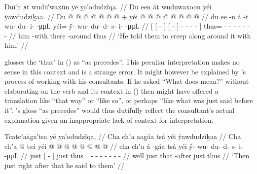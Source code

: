 \ex\label{ex:93-57-tell-them-go-with-him}%
%
\begingl
	\glpreamble	Duī′n ᴀt wudū′waxūn yē ỵa′odudzîqa. //
	\glpreamble	Du een át wuduwaxoon yéi ÿawdudziḵaa. //
	\gla	{} {} Du  @ {} {}
			{}  @ {} {}
			 @ {} @ {} @ {} @ {} @ {} {} +
		yéi @  @ {} @ {} @ {} @ {} @ {} @ {} @ {} //
	\glb	{} {} du ee -n {}
			{} á -t {}
			wu- du- i-  -μμL {} {}
		yéi= ÿ- wu- du- d- s- i-  -μμL //
	\glc	{}[ {}[   - {}]
			{}[  - {}]
			- - -  - \· {}]
		thus= - - - - - -  - //
	\gld	{} {} him {} -with {}
			{} there -around {}
			 {} {} {} {} {} {}
		thus  {} {} {} {} {} {} {} //
	\glft	‘He told them to creep along around it with him.’
		//
\endgl
\xe

\citeauthor{swanton:1909} glosses the  ‘thus’ in (\lastx) as “as precedes”.
This peculiar interpretation makes no sense in this context and is a strange error.
It might however be explained by \citeauthor{swanton:1909}’s process of working with his consultants.
If he asked “What does  mean?” without elaborating on the verb and its context in (\lastx) then  might have offered a translation like “that way” or “like so”, or perhaps “like what was just said before it”.
\citeauthor{swanton:1909}’s gloss “as precedes” would thus dutifully reflect the consultant’s actual explanation given an inappropriate lack of context for interpretation.


\ex\label{ex:93-58-right-then-he-said}%
%
\begingl
	\glpreamble	Tcatc!aāg̣a′tsa yē ỵa′odudzîqa, //
	\glpreamble	Cha chʼa aag̱áa tsá yéi ÿawdudziḵaa //
	\gla	Cha chʼa {}  @ {} {} tsá
		yéi @  @ {} @ {} @ {} @ {} @ {} @ {} @ {} //
	\glb	cha chʼa {} á -g̱áa {} tsá
		yéi ÿ- wu- du- d- s- i-  -μμL //
	\glc	{} just {}[  - {}] just
		thus= - - - - - -  - //
	\gld	well just {} that -after {} just
		thus  {} {} {} {} {} {} {} //
	\glft	‘Then just right after that he said to them’
		//
\endgl
\xe

